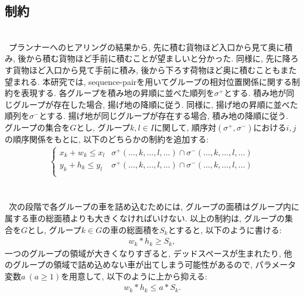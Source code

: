 \subsection{制約}
\\
\ プランナーへのヒアリングの結果から, 先に積む貨物ほど入口から見て奥に積み, 後から積む貨物ほど手前に積むことが望ましいと分かった. 
同様に, 先に降ろす貨物ほど入口から見て手前に積み, 後から下ろす荷物ほど奥に積むこともまた望まれる. 
本研究では, sequence-pairを用いてグループの相対位置関係に関する制約を表現する. 
各グループを積み地の昇順に並べた順列を$\sigma^+$とする. 
積み地が同じグループが存在した場合, 揚げ地の降順に従う. 
同様に, 揚げ地の昇順に並べた順列を$\sigma^-$とする. 
揚げ地が同じグループが存在する場合, 積み地の降順に従う. \\
グループの集合を$G$とし, グループ$k,l \in I$に関して, 順序対$(\sigma^+,\sigma^-)$における$i,j$の順序関係をもとに, 以下のどちらかの制約を追加する: \\
\begin{eqnarray}
    \left\{
        \begin{array}{ll}
            x_k + w_k \leq x_l & \sigma^+(\ldots,k,\ldots,l,\ldots) \cap \sigma^-(\ldots,k,\ldots,l,\ldots) \\
            y_k + h_k \leq y_l & \sigma^+(\ldots,k,\ldots,l,\ldots) \cap \sigma^-(\ldots,k,\ldots,l,\ldots) \\
        \end{array}
    \right.
\end{eqnarray}\\


\\
\ 次の段階で各グループの車を詰め込むためには, グループの面積はグループ内に属する車の総面積よりも大きくなければいけない. 
以上の制約は, グループの集合を$G$とし, グループ$k \in G$の車の総面積を$S_k$とすると, 以下のように書ける: \\
\begin{eqnarray}
    w_k*h_k \geq S_k , 
\end{eqnarray}
一つのグループの領域が大きくなりすぎると, デッドスペースが生まれたり, 他のグループの領域で詰め込めない車が出てしまう可能性があるので, パラメータ変数$a\ (a \geq 1)$を用意して, 以下のように上から抑える:  
\begin{eqnarray}
    w_k*h_k \leq a*S_k.
    \label{a_const}
\end{eqnarray}\\

